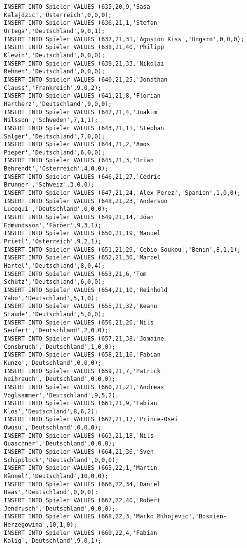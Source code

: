 \documentclass{lehramt-informatik-aufgabe}
\begin{document}
\begin{verbatim}
INSERT INTO Spieler VALUES (635,20,9,'Sasa Kalajdzic','Österreich',0,0,0);
INSERT INTO Spieler VALUES (636,21,1,'Stefan Ortega','Deutschland',9,0,1);
INSERT INTO Spieler VALUES (637,21,31,'Agoston Kiss','Ungarn',0,0,0);
INSERT INTO Spieler VALUES (638,21,40,'Philipp Klewin','Deutschland',0,0,0);
INSERT INTO Spieler VALUES (639,21,33,'Nikolai Rehnen','Deutschland',0,0,0);
INSERT INTO Spieler VALUES (640,21,25,'Jonathan Clauss','Frankreich',9,0,2);
INSERT INTO Spieler VALUES (641,21,8,'Florian Hartherz','Deutschland',9,0,0);
INSERT INTO Spieler VALUES (642,21,4,'Joakim Nilsson','Schweden',7,1,1);
INSERT INTO Spieler VALUES (643,21,11,'Stephan Salger','Deutschland',7,0,0);
INSERT INTO Spieler VALUES (644,21,2,'Amos Pieper','Deutschland',6,0,0);
INSERT INTO Spieler VALUES (645,21,3,'Brian Behrendt','Österreich',4,0,0);
INSERT INTO Spieler VALUES (646,21,27,'Cédric Brunner','Schweiz',3,0,0);
INSERT INTO Spieler VALUES (647,21,24,'Alex Perez','Spanien',1,0,0);
INSERT INTO Spieler VALUES (648,21,23,'Anderson Lucoqui','Deutschland',0,0,0);
INSERT INTO Spieler VALUES (649,21,14,'Jóan Edmundsson','Färöer',9,3,1);
INSERT INTO Spieler VALUES (650,21,19,'Manuel Prietl','Österreich',9,2,1);
INSERT INTO Spieler VALUES (651,21,29,'Cebio Soukou','Benin',8,1,1);
INSERT INTO Spieler VALUES (652,21,30,'Marcel Hartel','Deutschland',8,0,4);
INSERT INTO Spieler VALUES (653,21,6,'Tom Schütz','Deutschland',6,0,0);
INSERT INTO Spieler VALUES (654,21,10,'Reinhold Yabo','Deutschland',5,1,0);
INSERT INTO Spieler VALUES (655,21,32,'Keanu Staude','Deutschland',5,0,0);
INSERT INTO Spieler VALUES (656,21,20,'Nils Seufert','Deutschland',2,0,0);
INSERT INTO Spieler VALUES (657,21,38,'Jomaine Consbruch','Deutschland',1,0,0);
INSERT INTO Spieler VALUES (658,21,16,'Fabian Kunze','Deutschland',0,0,0);
INSERT INTO Spieler VALUES (659,21,7,'Patrick Weihrauch','Deutschland',0,0,0);
INSERT INTO Spieler VALUES (660,21,21,'Andreas Voglsammer','Deutschland',9,5,2);
INSERT INTO Spieler VALUES (661,21,9,'Fabian Klos','Deutschland',8,6,2);
INSERT INTO Spieler VALUES (662,21,17,'Prince-Osei Owusu','Deutschland',0,0,0);
INSERT INTO Spieler VALUES (663,21,18,'Nils Quaschner','Deutschland',0,0,0);
INSERT INTO Spieler VALUES (664,21,36,'Sven Schipplock','Deutschland',0,0,0);
INSERT INTO Spieler VALUES (665,22,1,'Martin Männel','Deutschland',10,0,0);
INSERT INTO Spieler VALUES (666,22,34,'Daniel Haas','Deutschland',0,0,0);
INSERT INTO Spieler VALUES (667,22,40,'Robert Jendrusch','Deutschland',0,0,0);
INSERT INTO Spieler VALUES (668,22,3,'Marko Mihojevic','Bosnien-Herzegowina',10,1,0);
INSERT INTO Spieler VALUES (669,22,4,'Fabian Kalig','Deutschland',9,0,1);

\end{verbatim}
\end{document}
